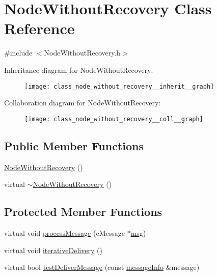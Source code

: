 \hypertarget{class_node_without_recovery}{}\section{Node\+Without\+Recovery Class Reference}
\label{class_node_without_recovery}


{\ttfamily \#include $<$Node\+Without\+Recovery.\+h$>$}



Inheritance diagram for Node\+Without\+Recovery\+:\nopagebreak
\begin{figure}[H]
\begin{center}
\leavevmode
\texttt{[image: class\_node\_without\_recovery\_\_inherit\_\_graph]}
\end{center}
\end{figure}


Collaboration diagram for Node\+Without\+Recovery\+:\nopagebreak
\begin{figure}[H]
\begin{center}
\leavevmode
\texttt{[image: class\_node\_without\_recovery\_\_coll\_\_graph]}
\end{center}
\end{figure}
\subsection*{Public Member Functions}
\begin{DoxyCompactItemize}
\item 
\hyperlink{class_node_without_recovery_a81c3fab3d91ae3bd6496b876d16694d8}{Node\+Without\+Recovery} ()
\item 
virtual \hyperlink{class_node_without_recovery_a2690cfda5b6d9998ee873babb3418870}{$\sim$\+Node\+Without\+Recovery} ()
\end{DoxyCompactItemize}
\subsection*{Protected Member Functions}
\begin{DoxyCompactItemize}
\item 
virtual void \hyperlink{class_node_without_recovery_a0b44132b4ebc650399711766cb050399}{process\+Message} (c\+Message $\ast$\hyperlink{_controller_8h_afa0f3b802fbc219228f7bb97996fa558}{msg})
\item 
virtual void \hyperlink{class_node_without_recovery_a65e21db6d6b4e72b898fd567f8b4aee2}{iterative\+Delivery} ()
\item 
virtual bool \hyperlink{class_node_without_recovery_a8cf83ec6d0af26e385dcde0bc03f5b6d}{test\+Deliver\+Message} (const \hyperlink{structures_8h_a7e7bdc1d2fff8a9436f2f352b2711ed6}{message\+Info} \&message)
\end{DoxyCompactItemize}
